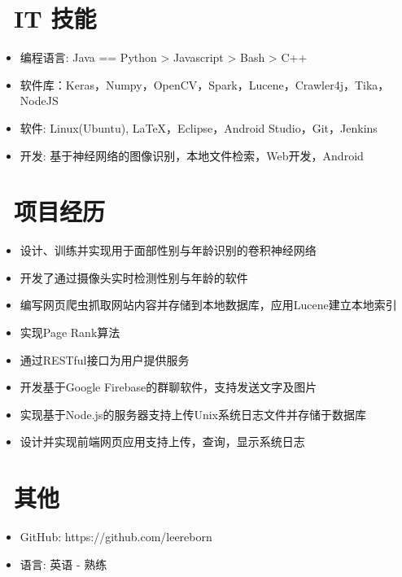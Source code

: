 \documentclass{resume}
\begin{document}
	\section{\faCogs\ IT 技能}
	\begin{itemize}[parsep=0.5ex]
		\item 编程语言: Java == Python > Javascript > Bash > C++
		\item 软件库：Keras，Numpy，OpenCV，Spark，Lucene，Crawler4j，Tika，NodeJS
		\item 软件: Linux(Ubuntu), \LaTeX，Eclipse，Android Studio，Git，Jenkins
		\item 开发: 基于神经网络的图像识别，本地文件检索，Web开发，Android
	\end{itemize}
	
	\section{\faCogs\ 项目经历}
	\begin{itemize}
		\item 设计、训练并实现用于面部性别与年龄识别的卷积神经网络
		\item 开发了通过摄像头实时检测性别与年龄的软件
	\end{itemize}
	\begin{itemize}
		\item 编写网页爬虫抓取网站内容并存储到本地数据库，应用Lucene建立本地索引
		\item 实现Page Rank算法
		\item 通过RESTful接口为用户提供服务
	\end{itemize}
	\begin{itemize}
		\item 开发基于Google Firebase的群聊软件，支持发送文字及图片
	\end{itemize}
	\begin{itemize}
		\item 实现基于Node.js的服务器支持上传Unix系统日志文件并存储于数据库
		\item 设计并实现前端网页应用支持上传，查询，显示系统日志
	\end{itemize}
	
	\section{\faInfo\ 其他}
	\begin{itemize}[parsep=0.5ex]
		\item GitHub: https://github.com/leereborn
		\item 语言: 英语 - 熟练
	\end{itemize}
	
\end{document}
